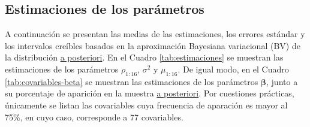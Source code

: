 \documentclass[11pt]{article}
\begin{document}

\subsection{Estimaciones de los parámetros}

A continuación se presentan las medias de las estimaciones, los errores estándar y los intervalos creíbles basados en la aproximación Bayesiana variacional (BV) de la distribución \underline{a posteriori}. En el Cuadro \ref{tab:estimaciones} se muestran las estimaciones de los parámetros $\rho_{1:16}$, $\sigma^{2}$ y $\mu_{1:16}$.
De igual modo, en el Cuadro \ref{tab:covariables-beta} se muestran las estimaciones de los parámetros $\boldsymbol{\beta}$, junto a su porcentaje de aparición en la muestra \underline{a posteriori}. Por cuestiones prácticas, únicamente se listan las covariables cuya frecuencia de aparación es mayor al 75\%, en cuyo caso, corresponde a 77 covariables.

\end{document}

